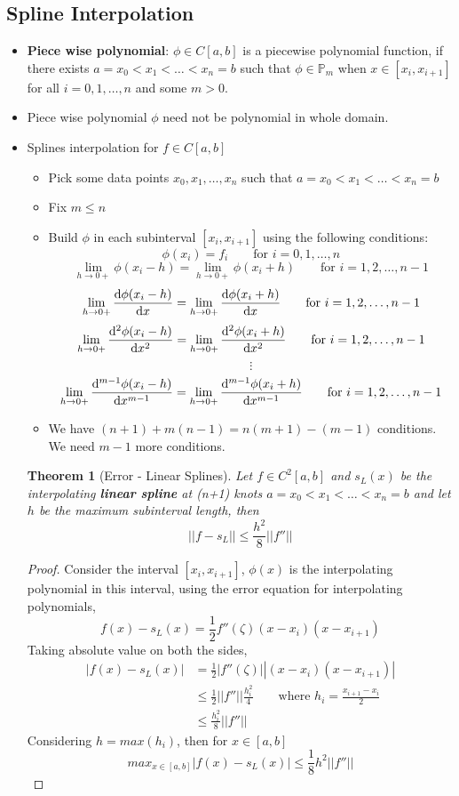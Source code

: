 \documentclass{article}
\newtheorem*{theorem}{Theorem}
\begin{document}
\subsection{Spline Interpolation}
\begin{itemize}
	\item \textbf{Piece wise polynomial}: $\phi \in C[a,b]$ is a piecewise polynomial function, if there exists $a=x_0<x_1<\hdots<x_n=b$ such that $\phi \in \mathbb{P}_m$ when $x \in [x_i,x_{i+1}]$ for all $i=0,1,\hdots,n$ and some $m>0$.


	\item Piece wise polynomial $\phi$ need not be polynomial in whole domain.

	\item Splines interpolation for $f \in C[a,b]$
	\begin{itemize}
		\item Pick some data points $x_0,x_1,\hdots,x_n$ such that $a=x_0<x_1<\hdots<x_n=b$
		\item Fix $m\leq n$
		\item Build $\phi$ in each subinterval $[x_i,x_{i+1}]$ using the following conditions:
			\[\phi(x_i)= f_i \qquad \text{for } i=0,1,\hdots,n\]
			\[\lim_{h\rightarrow 0+} \phi(x_i-h) = \lim_{h\rightarrow 0+} \phi(x_i+h) \qquad \text{for } i=1,2,\hdots,n-1\]
			\[\lim_{h\rightarrow 0+} \dv{\phi(x_i-h)}{x} = \lim_{h\rightarrow 0+} \dv{\phi(x_i+h)}{x} \qquad \text{for } i=1,2,\hdots,n-1\]
			\[\lim_{h\rightarrow 0+} \dv[2]{\phi(x_i-h)}{x} = \lim_{h\rightarrow 0+} \dv[2]{\phi(x_i+h)}{x} \qquad \text{for } i=1,2,\hdots,n-1\]
			\[\vdots\]
			\[\lim_{h\rightarrow 0+} \dv[m-1]{\phi(x_i-h)}{x} = \lim_{h\rightarrow 0+} \dv[m-1]{\phi(x_i+h)}{x} \qquad \text{for } i=1,2,\hdots,n-1\]
		\item We have $(n+1)+m(n-1)=n(m+1)-(m-1)$ conditions. We need $m-1$ more conditions.
	\end{itemize}

	\begin{theorem}[Error - Linear Splines]
		Let $f\in C^2[a,b]$ and $s_L(x)$ be the interpolating \textbf{linear spline} at (n+1) knots $a=x_0<x_1<\hdots<x_n=b$ and let $h$ be the maximum subinterval length, then
			\[||f-s_L|| \leq \frac{h^2}{8} ||f''||\] 
	\end{theorem}
	\begin{proof}
		Consider the interval $[x_i,x_{i+1}]$, $\phi(x)$ is the interpolating polynomial in this interval, using the error equation for interpolating polynomials,
		\[f(x)-s_L(x)=\frac{1}{2} f''(\zeta) (x-x_i)(x-x_{i+1})\]
		Taking absolute value on both the sides,
		\begin{align*}
			|f(x)-s_L(x)| &= \frac{1}{2} |f''(\zeta)| |(x-x_i)(x-x_{i+1})|\\
						&\leq \frac{1}{2} ||f''|| \frac{h_i^2}{4} \qquad \text{where $h_i = \frac{x_{i+1}-x_i}{2}$ }\\
						&\leq \frac{h_i^2}{8} ||f''||
		\end{align*}
		Considering $h=max (h_i)$, then for $x\in [a,b]$
			\[max_{x\in [a,b]}|f(x)-s_L(x)| \leq \frac{1}{8} h^2||f''||\]


\end{proof}
\end{itemize}
\end{document}
